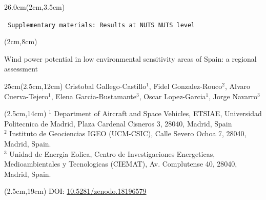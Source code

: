 \documentclass{article}
\begin{document}
\pagestyle{empty} %





\begin{textblock*}{26.0cm}(2cm,3.5cm)
\begin{tcolorbox}[colback=white,colframe=titleblue,boxrule=0.5pt,arc=5pt,left=0pt,right=15pt,top=15pt,bottom=15pt]
\Huge
{\color{titleblue}
  \texttt{~Supplementary materials: Results at NUTS {NUTS} level}
}
\end{tcolorbox}
\end{textblock*}





\begin{textblock*}{\textwidth}(2cm,8cm)
  {\color{titleblue}
  \parbox{27cm}{
    \fontsize{35}{50}\selectfont
    Wind power potential in low environmental sensitivity
    areas of Spain: a regional assessment\color{black}{$^*$}
  }}
\end{textblock*}


\begin{textblock*}{25cm}(2.5cm,12cm)
\LARGE
\noindent Cristobal Gallego-Castillo$^1$, Fidel Gonzalez-Rouco$^2$, Alvaro Cuerva-Tejero$^1$, Elena Garcia-Bustamante$^3$, Oscar Lopez-Garcia$^1$, Jorge Navarro$^3$
\end{textblock*}


\begin{textblock*}{\textwidth}(2.5cm,14cm)
\large
\noindent $^1$ Department of Aircraft and Space Vehicles, ETSIAE, Universidad Politecnica de Madrid, Plaza Cardenal Cisneros 3, 28040, Madrid, Spain \\
\noindent $^2$ Instituto de Geociencias IGEO (UCM-CSIC), Calle Severo Ochoa 7, 28040, Madrid, Spain. \\
\noindent $^3$ Unidad de Energia Eolica, Centro de Investigaciones Energeticas, Medioambientales y Tecnologicas (CIEMAT), Av. Complutense 40, 28040, Madrid, Spain. \\
\end{textblock*}




\begin{textblock*}{\textwidth}(2.5cm,19cm)
\Large
\noindent \color{black}{$^*$}\textcolor{black}{DOI: \href{https://doi.org/10.5281/zenodo.18196579}{10.5281/zenodo.18196579}}
\end{textblock*}
\end{document}
